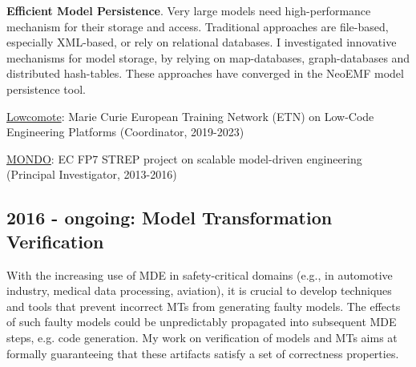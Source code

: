 \documentclass[10pt,a4paper]{article}
\begin{document}
\textbf{Efficient Model Persistence}. Very large models need high-performance mechanism for their storage and access. Traditional approaches are file-based, especially XML-based, or rely on relational databases. I investigated innovative mechanisms for model storage, by relying on map-databases, graph-databases and distributed hash-tables. These approaches have converged in the NeoEMF model persistence tool.


\medskip
{\footnotesize 
  \href{https://www.lowcomote.eu/}{Lowcomote}: Marie Curie European
  Training Network (ETN) on Low-Code Engineering Platforms (Coordinator,
  2019-2023)

  \href{http://www.mondo-project.org/}{MONDO}: EC FP7 STREP project on
    scalable model-driven engineering (Principal Investigator, 2013-2016)
}

\subsection{2016 - ongoing: Model Transformation Verification}

With the increasing use of MDE in safety-critical domains (e.g., in automotive industry, medical data processing, aviation), it is crucial to develop techniques and tools that prevent incorrect MTs from generating faulty models. The effects of such faulty models could be unpredictably propagated into subsequent MDE steps, e.g. code generation.
My work on verification of models and MTs aims at formally guaranteeing that these artifacts satisfy a set of correctness properties. %
\end{document}
